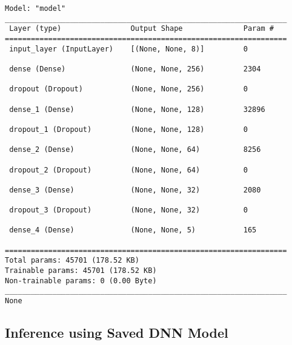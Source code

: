 \documentclass[
  letterpaper,
  DIV=11,
  numbers=noendperiod]{scrreprt}
\begin{document}
\begin{verbatim}
Model: "model"
_________________________________________________________________
 Layer (type)                Output Shape              Param #   
=================================================================
 input_layer (InputLayer)    [(None, None, 8)]         0         
                                                                 
 dense (Dense)               (None, None, 256)         2304      
                                                                 
 dropout (Dropout)           (None, None, 256)         0         
                                                                 
 dense_1 (Dense)             (None, None, 128)         32896     
                                                                 
 dropout_1 (Dropout)         (None, None, 128)         0         
                                                                 
 dense_2 (Dense)             (None, None, 64)          8256      
                                                                 
 dropout_2 (Dropout)         (None, None, 64)          0         
                                                                 
 dense_3 (Dense)             (None, None, 32)          2080      
                                                                 
 dropout_3 (Dropout)         (None, None, 32)          0         
                                                                 
 dense_4 (Dense)             (None, None, 5)           165       
                                                                 
=================================================================
Total params: 45701 (178.52 KB)
Trainable params: 45701 (178.52 KB)
Non-trainable params: 0 (0.00 Byte)
_________________________________________________________________
None
\end{verbatim}

\subsection{Inference using Saved DNN
Model}\label{inference-using-saved-dnn-model}
\end{document}
